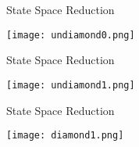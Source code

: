 \documentclass[xcolor=dvipsnames]{beamer}
\begin{document}
\begin{frame}{State Space Reduction}
	\begin{center}
	\texttt{[image: undiamond0.png]}
	\end{center}
\end{frame}
\begin{frame}{State Space Reduction}
	\begin{center}
	\texttt{[image: undiamond1.png]}
	\end{center}
\end{frame}
\begin{frame}{State Space Reduction}
	\begin{center}
	\texttt{[image: diamond1.png]}
	\end{center}
\end{frame}
\end{document}
